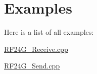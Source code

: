 \section{Examples}
Here is a list of all examples\+:\begin{DoxyCompactItemize}
\item 
\hyperlink{_r_f24_g__receive_8cpp-example}{R\+F24\+G\+\_\+\+Receive.\+cpp}
\item 
\hyperlink{_r_f24_g__send_8cpp-example}{R\+F24\+G\+\_\+\+Send.\+cpp}
\end{DoxyCompactItemize}
